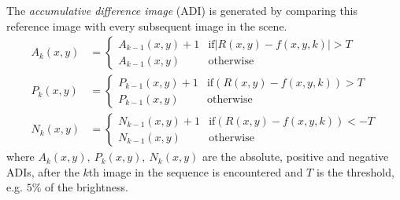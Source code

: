The \emph{accumulative difference image} (ADI) is generated by comparing this reference image with every subsequent image in the scene.
\begin{align*}
	A_k(x,y) &=
		\begin{cases}
			A_{k-1}(x,y) + 1 & \text{if} \left|R(x,y) - f(x,y,k)\right| > T \\
			A_{k-1}(x,y) & \text{otherwise}
		\end{cases} \\
	P_k(x,y) &=
		\begin{cases}
			P_{k-1}(x,y) + 1 & \text{if} \left(R(x,y) - f(x,y,k)\right) > T \\
			P_{k-1}(x,y) & \text{otherwise}
		\end{cases} \\
	N_k(x,y) &=
		\begin{cases}
			N_{k-1}(x,y) + 1 & \text{if} \left(R(x,y) - f(x,y,k)\right) < -T \\
			N_{k-1}(x,y) & \text{otherwise}
		\end{cases}
\end{align*}
where $A_k(x,y), \: P_k(x,y), \: N_k(x,y)$ are the absolute, positive and negative ADIs, after the $k$th image in the sequence is encountered and $T$ is the threshold, e.g. $5\%$ of the brightness.
